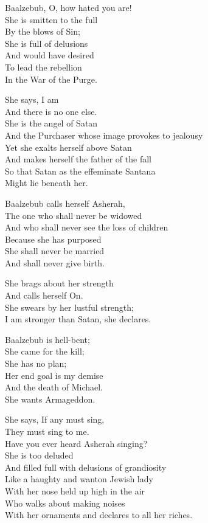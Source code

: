 \documentclass[
]{book}
\begin{document}
Baalzebub, O, how hated you are!\\
She is smitten to the full\\
By the blows of Sin;\\
She is full of delusions\\
And would have desired\\
To lead the rebellion\\
In the War of the Purge.

She says, I am\\
And there is no one else.\\
She is the angel of Satan\\
And the Purchaser whose image provokes to jealousy\\
Yet she exalts herself above Satan\\
And makes herself the father of the fall\\
So that Satan as the effeminate Santana\\
Might lie beneath her.

Baalzebub calls herself Asherah,\\
The one who shall never be widowed\\
And who shall never see the loss of children\\
Because she has purposed\\
She shall never be married\\
And shall never give birth.

She brags about her strength\\
And calls herself On.\\
She swears by her lustful strength;\\
I am stronger than Satan, she declares.

Baalzebub is hell-bent;\\
She came for the kill;\\
She has no plan;\\
Her end goal is my demise\\
And the death of Michael.\\
She wants Armageddon.

She says, If any must sing,\\
They must sing to me.\\
Have you ever heard Asherah singing?\\
She is too deluded\\
And filled full with delusions of grandiosity\\
Like a haughty and wanton Jewish lady\\
With her nose held up high in the air\\
Who walks about making noises\\
With her ornaments and declares to all her riches.
\end{document}
